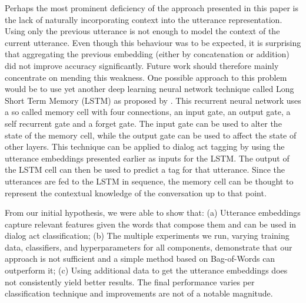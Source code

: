 Perhaps the most prominent deficiency of the approach presented in this paper is the lack of naturally incorporating context into the utterance representation. Using only the previous utterance is not enough to model the context of the current utterance. Even though this behaviour was to be expected, it is surprising that aggregating the previous embedding (either by concatenation or addition) did not improve accuracy significantly. Future work should therefore mainly concentrate on mending this weakness. One possible approach to this problem would be to use yet another deep learning neural network technique called Long Short Term Memory (LSTM) as proposed by . This recurrent neural network uses a so called memory cell with four connections, an input gate, an output gate, a self recurrent gate and a forget gate. The input gate can be used to alter the state of the memory cell, while the output gate can be used to affect the state of other layers. This technique can be applied to dialog act tagging by using the utterance embeddings presented earlier as inputs for the LSTM. The output of the LSTM cell can then be used to predict a tag for that utterance. Since the utterances are fed to the LSTM in sequence, the memory cell can be thought to represent the contextual knowledge of the conversation up to that point.

From our initial hypothesis, we were able to show that: (a) Utterance embeddings capture relevant features given the words that compose them and can be used in dialog act classification; (b) The multiple experiments we run, varying training data, classifiers, and hyperparameters for all components, demonstrate that our approach is not sufficient and a simple method based on Bag-of-Words can outperform it; (c) Using additional data to get the utterance embeddings does not consistently yield better results. The final performance varies per classification technique and improvements are not of a notable magnitude.
